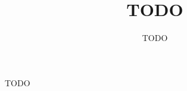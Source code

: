 \documentclass[a4paper, 12pt]{report}
\title{TODO}
\author{TODO}
\begin{document}
\maketitle

\tableofcontents

TODO
\end{document}
